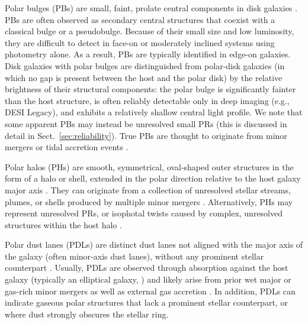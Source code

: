 \documentclass{aa}
\begin{document}
Polar bulges (PBs) are small, faint, prolate central components in disk galaxies \citep{2012MNRAS.423L..79C,2015AstL...41..748R}. PBs are often observed as secondary central structures that coexist with a classical bulge or a pseudobulge. Because of their small size and low luminosity, they are difficult to detect in face-on or moderately inclined systems using photometry alone. As a result, PBs are typically identified in edge-on galaxies. Disk galaxies with polar bulges are distinguished from polar-disk galaxies (in which no gap is present between the host and the polar disk) by the relative brightness of their structural components: the polar bulge is significantly fainter than the host structure, is often reliably detectable only in deep imaging (e.g., DESI Legacy), and exhibits a relatively shallow central light profile. We note that some apparent PBs may instead be unresolved small PRs (this is discussed in detail in Sect.~\ref{sec:reliability}). True PBs are thought to originate from minor mergers or tidal accretion events \citep{2025A&A...698L..21B}.

Polar halos (PHs) are smooth, symmetrical, oval-shaped outer structures in the form of a halo or shell, extended in the polar direction relative to the host galaxy major axis \citep{2020MNRAS.494.1751M,2022RAA....22k5003M}. They can originate from a collection of unresolved stellar streams, plumes, or shells produced by multiple minor mergers \citep{2005ApJ...635..931B,2010MNRAS.406..744C,2016ApJ...830...62M,2025ApJ...989..107W}. Alternatively, PHs may represent unresolved PRs, or isophotal twists caused by complex, unresolved structures within the host halo \citep{2001ApJ...548...33B}.

Polar dust lanes (PDLs) are distinct dust lanes not aligned with the major axis of the galaxy (often minor‐axis dust lanes), without any prominent stellar counterpart \citep{1978ApJ...226L.115B}. Usually, PDLs are observed through absorption against the host galaxy (typically an elliptical galaxy, \citealt{1987IAUS..127..135B}) and likely arise from prior wet major \citep{1997ApJ...486L..87B} or gas-rich minor \citep{2012MNRAS.423...59S,2015MNRAS.449.3503D} mergers as well as external gas accretion \citep{2005A&A...435...43V}. In addition, PDLs can indicate gaseous polar structures that lack a prominent stellar counterpart, or where dust strongly obscures the stellar ring.
\end{document}
